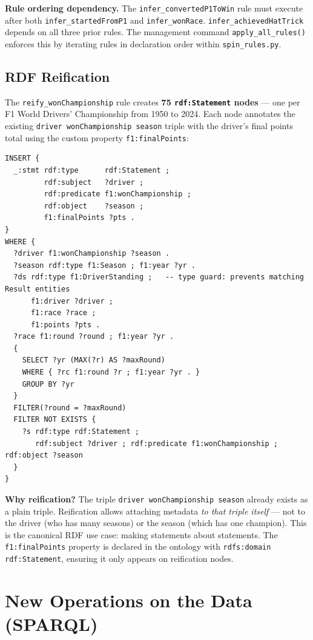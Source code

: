 \documentclass[12pt,a4paper]{article}
\begin{document}
\textbf{Rule ordering dependency.}
The \texttt{infer\_convertedP1ToWin} rule must execute after both
\texttt{infer\_startedFromP1} and \texttt{infer\_wonRace}.
\texttt{infer\_achievedHatTrick} depends on all three prior rules.
The management command \texttt{apply\_all\_rules()} enforces this by iterating
rules in declaration order within \texttt{spin\_rules.py}.

\subsection{RDF Reification}

The \texttt{reify\_wonChampionship} rule creates \textbf{75 \texttt{rdf:Statement}
nodes} --- one per F1 World Drivers' Championship from 1950 to 2024. Each node
annotates the existing \texttt{driver wonChampionship season} triple with the
driver's final points total using the custom property \texttt{f1:finalPoints}:

\begin{lstlisting}[style=sparql, caption={SPIN rule: reify\_wonChampionship}]
INSERT {
  _:stmt rdf:type      rdf:Statement ;
         rdf:subject   ?driver ;
         rdf:predicate f1:wonChampionship ;
         rdf:object    ?season ;
         f1:finalPoints ?pts .
}
WHERE {
  ?driver f1:wonChampionship ?season .
  ?season rdf:type f1:Season ; f1:year ?yr .
  ?ds rdf:type f1:DriverStanding ;   -- type guard: prevents matching Result entities
      f1:driver ?driver ;
      f1:race ?race ;
      f1:points ?pts .
  ?race f1:round ?round ; f1:year ?yr .
  {
    SELECT ?yr (MAX(?r) AS ?maxRound)
    WHERE { ?rc f1:round ?r ; f1:year ?yr . }
    GROUP BY ?yr
  }
  FILTER(?round = ?maxRound)
  FILTER NOT EXISTS {
    ?s rdf:type rdf:Statement ;
       rdf:subject ?driver ; rdf:predicate f1:wonChampionship ; rdf:object ?season
  }
}
\end{lstlisting}

\textbf{Why reification?} The triple \texttt{driver wonChampionship season} already
exists as a plain triple. Reification allows attaching metadata \emph{to that triple
itself} --- not to the driver (who has many seasons) or the season (which has one
champion). This is the canonical RDF use case: making statements about statements.
The \texttt{f1:finalPoints} property is declared in the ontology with
\texttt{rdfs:domain rdf:Statement}, ensuring it only appears on reification nodes.

\section{New Operations on the Data (SPARQL)}
\end{document}
